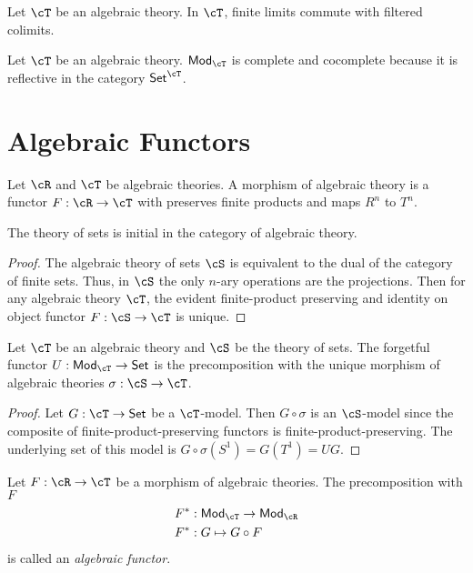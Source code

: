 \documentclass{amsart}
\begin{document}
\begin{lem}
  Let $\cT$ be an algebraic theory.
  In $\mathsf{\cT}$, finite limits commute with filtered colimits.
\end{lem}

\begin{lem}\label{lem:model-category-complete-cocomplete}
  Let $\cT$ be an algebraic theory.
  $\mathsf{Mod}_{\cT}$ is complete and cocomplete because it is reflective in the category $\mathsf{Set}^{\cT}$.
\end{lem}

\section{Algebraic Functors}
\label{sec:algebraic-functors}

\begin{defn}
  Let $\cR$ and $\cT$ be algebraic theories.
  A morphism of algebraic theory is a functor $F : \cR \to \cT$ with preserves finite products and maps $R^{n}$ to $T^{n}$.
\end{defn}

\begin{lem}
  The theory of sets is initial in the category of algebraic theory.
\end{lem}
\begin{proof}
  The algebraic theory of sets $\cS$ is equivalent to the dual of the category of finite sets.
  Thus, in $\cS$ the only $n$-ary operations are the projections.
  Then for any algebraic theory $\cT$, the evident finite-product preserving and identity on object functor $F : \cS \to \cT$ is unique.
\end{proof}

\begin{cor}\label{cor:forgetful-functor-is-precomposition}
  Let $\cT$ be an algebraic theory and $\cS$ be the theory of sets.
  The forgetful functor $U : \mathsf{Mod}_{\cT} \to \mathsf{Set}$ is the precomposition with the unique morphism of algebraic theories $\sigma : \cS \to \cT$.
\end{cor}
\begin{proof}
  Let $G : \cT \to \mathsf{Set}$ be a $\cT$-model.
  Then $G \circ \sigma$ is an $\cS$-model since the composite of finite-product-preserving functors is finite-product-preserving.
  The underlying set of this model is $G \circ \sigma(S^{1}) = G(T^{1}) = UG$.
\end{proof}

\begin{defn}
  Let $F : \cR \to \cT$ be a morphism of algebraic theories.
  The precomposition with $F$
  \begin{align}
    F^{*} &: \mathsf{Mod}_{\cT} \to \mathsf{Mod}_{\cR}\\
    F^{*} &: G \mapsto G \circ F
  \end{align}
  is called an \emph{algebraic functor}.
\end{defn}
\end{document}
